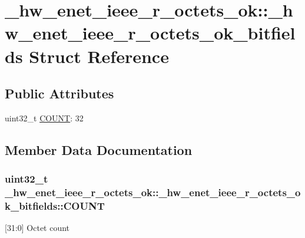\hypertarget{struct__hw__enet__ieee__r__octets__ok_1_1__hw__enet__ieee__r__octets__ok__bitfields}{}\section{\+\_\+hw\+\_\+enet\+\_\+ieee\+\_\+r\+\_\+octets\+\_\+ok\+:\+:\+\_\+hw\+\_\+enet\+\_\+ieee\+\_\+r\+\_\+octets\+\_\+ok\+\_\+bitfields Struct Reference}
\label{struct__hw__enet__ieee__r__octets__ok_1_1__hw__enet__ieee__r__octets__ok__bitfields}
\subsection*{Public Attributes}
\begin{DoxyCompactItemize}
\item 
uint32\+\_\+t \hyperlink{struct__hw__enet__ieee__r__octets__ok_1_1__hw__enet__ieee__r__octets__ok__bitfields_a412b84c882e6dba66c0406325c6dd756}{C\+O\+U\+NT}\+: 32
\end{DoxyCompactItemize}


\subsection{Member Data Documentation}
\subsubsection[{\texorpdfstring{C\+O\+U\+NT}{COUNT}}]{\setlength{\rightskip}{0pt plus 5cm}uint32\+\_\+t \+\_\+hw\+\_\+enet\+\_\+ieee\+\_\+r\+\_\+octets\+\_\+ok\+::\+\_\+hw\+\_\+enet\+\_\+ieee\+\_\+r\+\_\+octets\+\_\+ok\+\_\+bitfields\+::\+C\+O\+U\+NT}\hypertarget{struct__hw__enet__ieee__r__octets__ok_1_1__hw__enet__ieee__r__octets__ok__bitfields_a412b84c882e6dba66c0406325c6dd756}{}\label{struct__hw__enet__ieee__r__octets__ok_1_1__hw__enet__ieee__r__octets__ok__bitfields_a412b84c882e6dba66c0406325c6dd756}
\mbox{[}31\+:0\mbox{]} Octet count 

